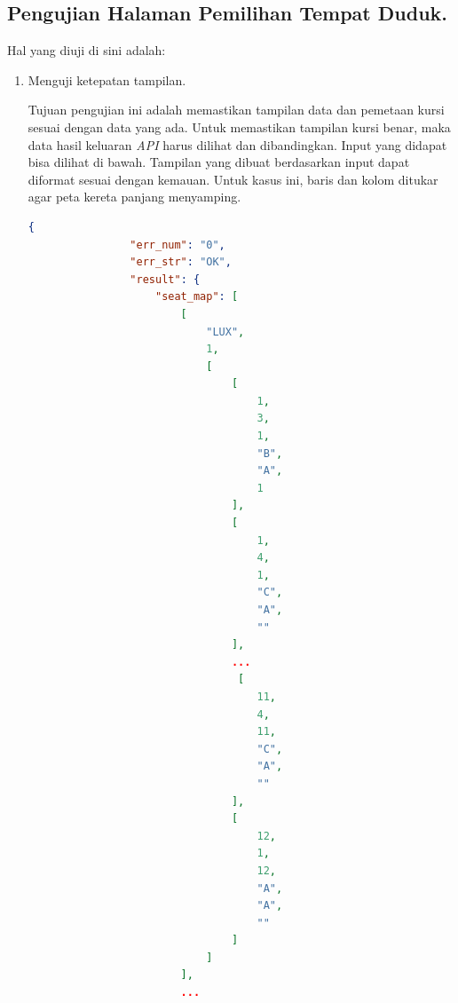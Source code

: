\subsection{Pengujian Halaman Pemilihan Tempat Duduk.}
\label{subsec:pengujianpilihkursi}

Hal yang diuji di sini adalah:
    \begin{enumerate}
        \item Menguji ketepatan tampilan.
        
        Tujuan pengujian ini adalah memastikan tampilan data dan pemetaan kursi sesuai dengan data yang ada. Untuk memastikan tampilan kursi benar, maka data hasil keluaran \textit{API} harus dilihat dan dibandingkan. Input yang didapat bisa dilihat di bawah. Tampilan yang dibuat berdasarkan input dapat diformat sesuai dengan kemauan. Untuk kasus ini, baris dan kolom ditukar agar peta kereta panjang menyamping.
        
        \begin{lstlisting}[language=json]
            {
                "err_num": "0",
                "err_str": "OK",
                "result": {
                    "seat_map": [
                        [
                            "LUX",
                            1,
                            [
                                [
                                    1,
                                    3,
                                    1,
                                    "B",
                                    "A",
                                    1
                                ],
                                [
                                    1,
                                    4,
                                    1,
                                    "C",
                                    "A",
                                    ""
                                ],
                                ...
                                 [
                                    11,
                                    4,
                                    11,
                                    "C",
                                    "A",
                                    ""
                                ],
                                [
                                    12,
                                    1,
                                    12,
                                    "A",
                                    "A",
                                    ""
                                ]
                            ]
                        ],
                        ...
        \end{lstlisting}
        

\end{enumerate}
